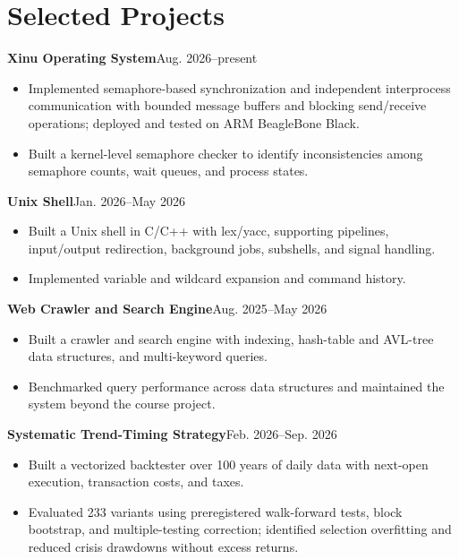 \documentclass[10pt,letterpaper]{article}
\newcommand{\entry}[2]{\textbf{#1}\hfill #2\par}
\newcommand{\subentry}[2]{\vspace{4pt}\textbf{#1}\hfill #2\par}
\begin{document}
\section{Selected Projects}
\entry{Xinu Operating System}{Aug. 2026--present}
\begin{itemize}
\item Implemented semaphore-based synchronization and independent interprocess communication with bounded message buffers and blocking send/receive operations; deployed and tested on ARM BeagleBone Black.
\item Built a kernel-level semaphore checker to identify inconsistencies among semaphore counts, wait queues, and process states.
\end{itemize}
\subentry{Unix Shell}{Jan. 2026--May 2026}
\begin{itemize}
\item Built a Unix shell in C/C++ with lex/yacc, supporting pipelines, input/output redirection, background jobs, subshells, and signal handling.
\item Implemented variable and wildcard expansion and command history.
\end{itemize}
\subentry{Web Crawler and Search Engine}{Aug. 2025--May 2026}
\begin{itemize}
\item Built a crawler and search engine with indexing, hash-table and AVL-tree data structures, and multi-keyword queries.
\item Benchmarked query performance across data structures and maintained the system beyond the course project.
\end{itemize}
\subentry{Systematic Trend-Timing Strategy}{Feb. 2026--Sep. 2026}
\begin{itemize}
\item Built a vectorized backtester over 100 years of daily data with next-open execution, transaction costs, and taxes.
\item Evaluated 233 variants using preregistered walk-forward tests, block bootstrap, and multiple-testing correction; identified selection overfitting and reduced crisis drawdowns without excess returns.
\end{itemize}
\end{document}
